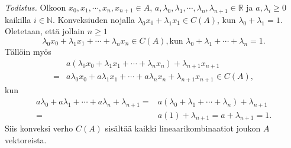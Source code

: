\documentclass[12pt,a4paper,reqno]{amsart}
\newcommand{\R}{\mathbb{R}}
\newcommand{\N}{\mathbb{N}}
\begin{document}
\emph{Todistus.} 
Olkoon $x_0,x_1,\cdots, x_n, x_{n+1} \in A$, $a,\lambda_0,\lambda_1,\cdots, \lambda_n, \lambda_{n+1} \in \R$ ja $a,\lambda_i\geq 0$ kaikilla $ i\in\N$. Konveksiuden nojalla 
$\lambda_0 x_0+\lambda_1 x_1 \in C(A)$, kun $\lambda_0 +\lambda_1=1$.
Oletetaan, että jollain $n\geq 1$ 
\begin{equation*}
\lambda_0 x_0+\lambda_1 x_1+\cdots+\lambda_{n} x_{n}\in C(A), \text{kun } \lambda_0+\lambda_1+\cdots+ \lambda_{n} =1.
 \end{equation*}
Tällöin myös
\begin{equation*}
\begin{split}
&a(\lambda_0 x_0+\lambda_1 x_1+\cdots+\lambda_{n}x_n)+\lambda_{n+1} x_{n+1}\\=&a\lambda_0 x_0+a\lambda_1 x_1+\cdots+a\lambda_{n}x_n+\lambda_{n+1} x_{n+1}
\in C(A),
\end{split}
\end{equation*}
kun 
\begin{equation*}
\begin{split}
a\lambda_0+a\lambda_1+\cdots+ a\lambda_{n}+ \lambda_{n+1}=&a(\lambda_0+\lambda_1+\cdots+ \lambda_{n})+ \lambda_{n+1}\\=&a(1)+ \lambda_{n+1}=a+ \lambda_{n+1}=1.
\end{split}
\end{equation*} 
Siis konveksi verho $C(A)$ sisältää kaikki lineaarikombinaatiot joukon $A$ vektoreista.
\end{document}
